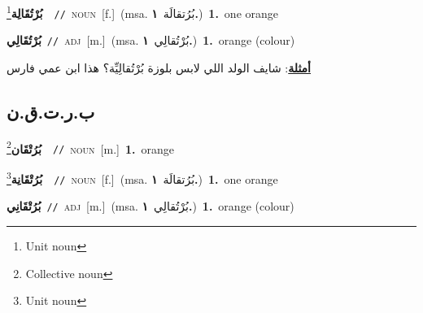 \documentclass[10pt,a4paper,twoside]{article} %
\begin{document}
\begin{multicols}{2}
{\setlength\topsep{0pt}\textbf{\foreignlanguage{arabic}{بُرْتُقَالِة}}\footnote{Unit noun}\ \ {\color{gray}\texttt{//}\color{black}}\ \textsc{noun}\ [f.]\ \color{gray}(msa. \foreignlanguage{arabic}{بُرُتقالَة}~\foreignlanguage{arabic}{\textbf{١.}})\color{black}\ \textbf{1.}~one orange\ } \vspace{2mm}

{\setlength\topsep{0pt}\textbf{\foreignlanguage{arabic}{بُرْتُقَالِي}}\ {\color{gray}\texttt{//}\color{black}}\ \textsc{adj}\ [m.]\ \color{gray}(msa. \foreignlanguage{arabic}{بُرْتُقالِي}~\foreignlanguage{arabic}{\textbf{١.}})\color{black}\ \textbf{1.}~orange (colour)\  \begin{flushright}\color{gray}\foreignlanguage{arabic}{\textbf{\underline{\foreignlanguage{arabic}{أمثلة}}}: شايف الولد اللي لابس بلوزة بُرْتُقالِيِّة؟ هذا ابن عمي فارس}\end{flushright}\color{black}} \vspace{2mm}

\vspace{-3mm}
\subsection*{\color{blue}\foreignlanguage{arabic}{ب.ر.ت.ق.ن}\color{blue}{ (ntws)}} 

{\setlength\topsep{0pt}\textbf{\foreignlanguage{arabic}{بُرُتْقَان}}\footnote{Collective noun}\ \ {\color{gray}\texttt{//}\color{black}}\ \textsc{noun}\ [m.]\ \textbf{1.}~orange\ } \vspace{2mm}

{\setlength\topsep{0pt}\textbf{\foreignlanguage{arabic}{بُرُتْقَانِة}}\footnote{Unit noun}\ \ {\color{gray}\texttt{//}\color{black}}\ \textsc{noun}\ [f.]\ \color{gray}(msa. \foreignlanguage{arabic}{بُرُتقالَة}~\foreignlanguage{arabic}{\textbf{١.}})\color{black}\ \textbf{1.}~one orange\ } \vspace{2mm}

{\setlength\topsep{0pt}\textbf{\foreignlanguage{arabic}{بُرُتْقَانِي}}\ {\color{gray}\texttt{//}\color{black}}\ \textsc{adj}\ [m.]\ \color{gray}(msa. \foreignlanguage{arabic}{بُرْتُقالِي}~\foreignlanguage{arabic}{\textbf{١.}})\color{black}\ \textbf{1.}~orange (colour)\ } \vspace{2mm}


\end{multicols}
\end{document}
